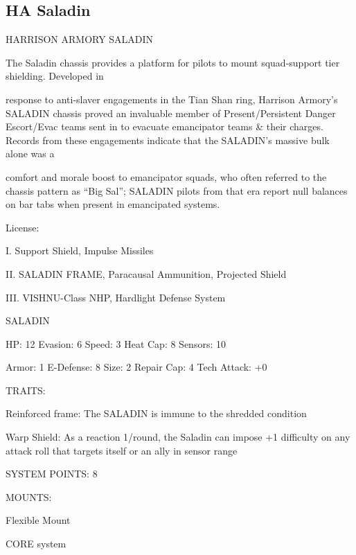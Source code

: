 \subsection{HA Saladin}

                                HARRISON ARMORY SALADIN

The Saladin chassis provides a platform for pilots to mount squad-support tier shielding. Developed in

response to anti-slaver engagements in the Tian Shan ring, Harrison Armory’s SALADIN chassis proved an
invaluable member of Present/Persistent Danger Escort/Evac teams sent in to evacuate emancipator teams
\& their charges. Records from these engagements indicate that the SALADIN’s massive bulk alone was a

comfort and morale boost to emancipator squads, who often referred to the chassis pattern as “Big Sal”;
SALADIN pilots from that era report null balances on bar tabs when present in emancipated systems.

                                                   License:

I. Support Shield, Impulse Missiles

II. SALADIN FRAME, Paracausal Ammunition, Projected Shield

III. VISHNU-Class NHP, Hardlight Defense System


                                                 SALADIN

 HP: 12         Evasion: 6                            Speed: 3            Heat Cap: 8        Sensors: 10

 Armor: 1       E-Defense: 8                          Size: 2             Repair Cap: 4      Tech Attack:
                                                                                             +0

                                                   TRAITS:

 Reinforced frame: The SALADIN is immune to the shredded condition

 Warp Shield: As a reaction 1/round, the Saladin can impose +1 difficulty on any attack roll that targets
 itself or an ally in sensor range

                                             SYSTEM POINTS: 8

                                                  MOUNTS:

 Flexible Mount

                                                CORE system




